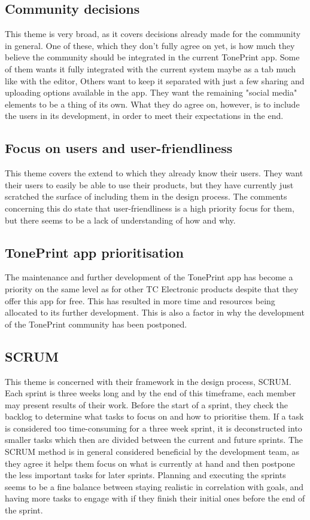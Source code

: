 \subsection*{Community decisions} 
\label{App:ThemeCommunityDecisions}
This theme is very broad, as it covers decisions already made for the community in general. One of these, which they don't fully agree on yet, is how much they believe the community should be integrated in the current TonePrint app. Some of them wants it fully integrated with the current system maybe as a tab much like with the editor, Others want to keep it separated with just a few sharing and uploading options available in the app. They want the remaining "social media" elements to be a thing of its own. What they do agree on, however, is to include the users in its development, in order to meet their expectations in the end.

\subsection*{Focus on users and user-friendliness} 
\label{App:ThemeFocusOnUsersAndUserFriendliness}
This theme covers the extend to which they already know their users. They want their users to easily be able to use their products, but they have currently just scratched the surface of including them in the design process. The comments concerning this do state that user-friendliness is a high priority focus for them, but there seems to be a lack of understanding of how and why.

\subsection*{TonePrint app prioritisation} 
\label{App:ThemePrioritizingOfTheTonePrintApp}
The maintenance and further development of the TonePrint app has become a priority on the same level as for other TC Electronic products despite that they offer this app for free. This has resulted in more time and resources being allocated to its further development. This is also a factor in why the development of the TonePrint community has been postponed.

\subsection*{SCRUM}
\label{App:ThemeScrum}
This theme is concerned with their framework in the design process, SCRUM. Each sprint is three weeks long and by the end of this timeframe, each member may present results of their work. Before the start of a sprint, they check the backlog to determine what tasks to focus on and how to prioritise them. If a task is considered too time-consuming for a three week sprint, it is deconstructed into smaller tasks which then are divided between the current and future sprints. The SCRUM method is in general considered beneficial by the development team, as they agree it helps them focus on what is currently at hand and then postpone the less important tasks for later sprints. Planning and executing the sprints seems to be a fine balance between staying realistic in correlation with goals, and having more tasks to engage with if they finish their initial ones before the end of the sprint.

